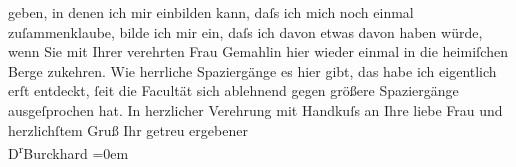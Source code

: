 \begin{ledgroupsized}[t]{13cm}
               geben, in denen ich mir einbilden kann, daſs ich mich noch einmal zuſammenklaube,
               bilde ich mir ein, daſs ich davon etwas davon haben würde, wenn Sie mit Ihrer
               verehrten Frau Gemahlin hier
               wieder einmal in die heimiſchen Berge zukehren. Wie herrliche Spaziergänge es hier
               gibt, das habe ich eigentlich erſt entdeckt, ſeit die Facultät sich ablehnend gegen
               größere Spaziergänge ausgeſprochen hat.\pend
           \pstart
           {\pb}In herzlicher Verehrung mit Handkuſs an
               Ihre liebe Frau und
               herzlichſtem Gruß\pend
           \pstart
           Ihr getreu ergebener{\\[\baselineskip]}\spacefill\mbox{D\textsuperscript{r}Burckhard}\pend
           \leftskip=0em{}
         
         \endnumbering{}\end{ledgroupsized}  \newcommand{\dateiname}{L01783}\newcommand{\titel}{Max Burckhard an Arthur Schnitzler, 14. 7. 1908}\newcommand{\editorInnen}{Martin Anton Müller und Gerd-Hermann Susen}
      